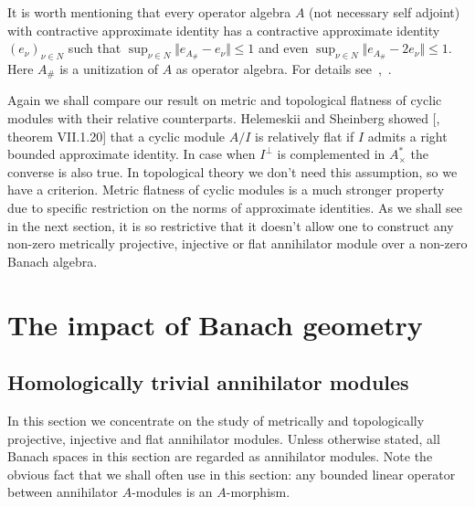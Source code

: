 It is worth mentioning that every operator algebra $A$ (not necessary self
adjoint) with contractive approximate identity has a contractive approximate
identity ${(e_\nu)}_{\nu\in N}$ such 
that $\sup_{\nu\in N}\Vert e_{A_\#}-e_\nu\Vert\leq 1$ and 
even $\sup_{\nu\in N}\Vert e_{A_\#}-2e_\nu\Vert\leq 1$. Here $A_\#$ is 
a unitization of $A$ as operator algebra. For details
see~\cite{PosAndApproxIdinBanAlg},~\cite{BleContrAppIdInOpAlg}.

Again we shall compare our result on metric and topological flatness of cyclic
modules with their relative counterparts. Helemeskii and Sheinberg showed
[\cite{HelHomolBanTopAlg}, theorem VII.1.20] that a cyclic module $A/I$ is relatively
flat if $I$ admits a right bounded approximate identity. In case when $I^\perp$
is complemented in $A_\times^*$ the converse is also true. In topological theory
we don't need this assumption, so we have a criterion. Metric flatness of cyclic
modules is a much stronger property due to specific restriction on the norms of
approximate identities. As we shall see in the next section, it is so restrictive
that it doesn't allow one to construct any non-zero metrically
projective, injective or flat annihilator module over a non-zero Banach algebra.


\section{
    The impact of Banach geometry}\label{SectionTheImpactOfBanachGeometry}



\subsection{
    Homologically trivial annihilator modules}\label{SubSectionHomoligicallyTrivialAnnihilatorModules}

In this section we concentrate on the study of metrically and topologically
projective, injective and flat annihilator modules. Unless otherwise stated, all
Banach spaces in this section are regarded as annihilator modules. Note the
obvious fact that we shall often use in this section: any bounded linear
operator between annihilator $A$-modules is an $A$-morphism.

